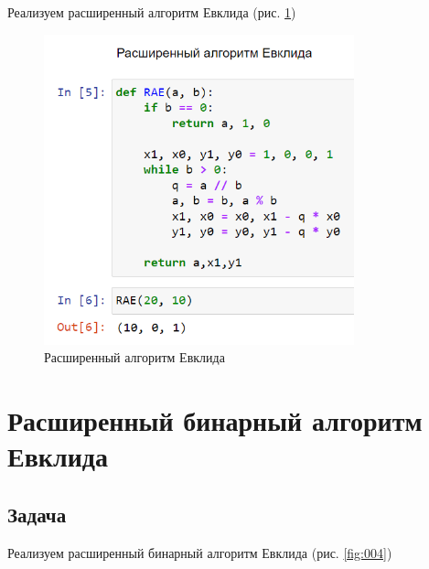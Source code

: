 \documentclass[
  12pt,
  a4paper,
]{scrreprt}
\begin{document}
Реализуем расширенный алгоритм Евклида (рис. \ref{fig:003})

\begin{figure}
\centering
\includegraphics[width=0.8\textwidth,height=\textheight]{./tex2pdf.-e48f57e5a48111ba/image/3.png}
\caption{Расширенный алгоритм Евклида}\label{fig:003}
\end{figure}

\section{Расширенный бинарный алгоритм
Евклида}\label{ux440ux430ux441ux448ux438ux440ux435ux43dux43dux44bux439-ux431ux438ux43dux430ux440ux43dux44bux439-ux430ux43bux433ux43eux440ux438ux442ux43c-ux435ux432ux43aux43bux438ux434ux430}

\subsection{Задача}\label{ux437ux430ux434ux430ux447ux430-3}

Реализуем расширенный бинарный алгоритм Евклида (рис. \ref{fig:004})
\end{document}
